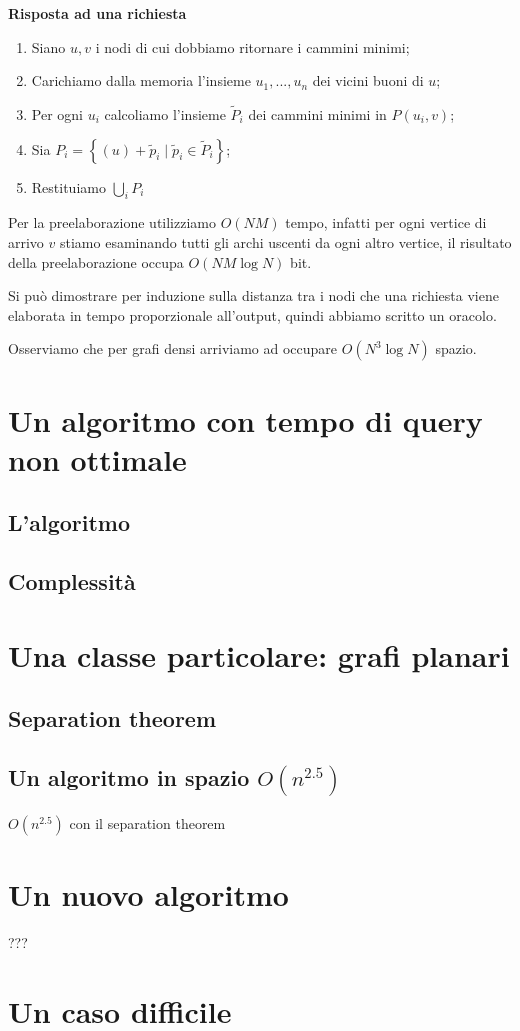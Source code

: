 \documentclass[a4paper,10pt]{amsbook}
\theoremstyle{plain}
\theoremstyle{definition}
\theoremstyle{remark}
\newcommand{\set}[1]{\left\{#1\right\}}
\newcommand{\pa}[1]{\left(#1\right)}
\begin{document}
\textbf{Risposta ad una richiesta}
\begin{enumerate}
\item Siano $u,v$ i nodi di cui dobbiamo ritornare i cammini minimi;
\item Carichiamo dalla memoria l'insieme $u_1,..., u_n$ dei vicini
  buoni di $u$;
\item Per ogni $u_i$ calcoliamo l'insieme $\tilde P _i$ dei cammini
  minimi in $P(u_i,v)$;
\item Sia $P_i = \set{ (u) + \tilde p _i \mid \tilde p_i \in \tilde
    P_i }$;
\item Restituiamo $\bigcup _i P_i$
\end{enumerate}

Per la preelaborazione utilizziamo $O\pa{ NM}$ tempo, infatti per ogni
vertice di arrivo $v$ stiamo esaminando tutti gli archi uscenti da
ogni altro vertice, il risultato della preelaborazione occupa $O\pa{
  NM \log N}$ bit.

Si pu\`o dimostrare per induzione sulla distanza tra i nodi che una
richiesta viene elaborata in tempo proporzionale all'output, quindi
abbiamo scritto un oracolo.

Osserviamo che per grafi densi arriviamo ad occupare $O\pa{ N^3 \log
  N}$ spazio.

\section{Un algoritmo con tempo di query non ottimale}

\subsection{L'algoritmo}

\subsection{Complessità}

\section{Una classe particolare: grafi planari}

\subsection{Separation theorem}

\subsection{Un algoritmo in spazio $O(n^{2.5})$}

$O(n^{2.5})$ con il separation theorem

\section{Un nuovo algoritmo}

???

\section{Un caso difficile}





\end{document}
